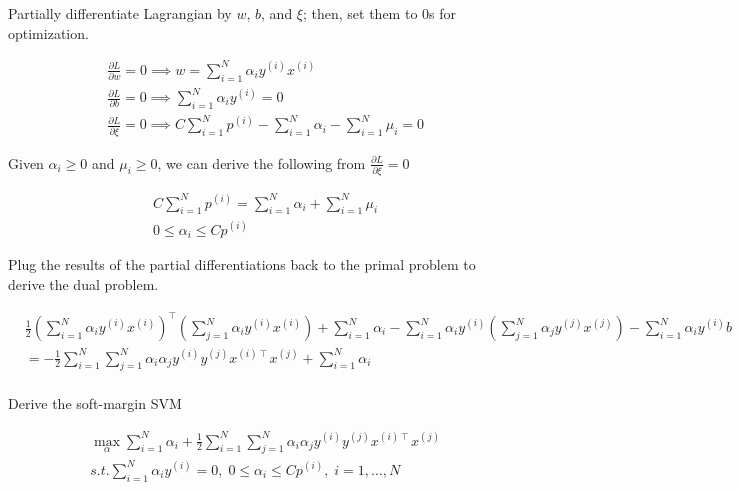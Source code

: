 \documentclass{article}
\theoremstyle{definition}
\theoremstyle{remark}
\begin{document}
\begin{enumerate}[font={\Large\bfseries},left=0pt]
\begin{tcolorbox}
\begin{enumerate}
\begin{enumerate}
				            Partially differentiate Lagrangian by $w$, $b$, and $\xi$; then, set them to 0s for optimization.

				            \begin{align}
					             & \frac{\partial L}{\partial w} = 0 \implies w = \sum^{N}_{i = 1} \alpha_i y^{(i)}x^{(i)}                                      \\
					             & \frac{\partial L}{\partial b} = 0 \implies \sum^{N}_{i = 1} \alpha_i y^{(i)} = 0                                             \\
					             & \frac{\partial L }{\partial \xi} = 0 \implies C\sum^N_{i = 1} p^{(i)} - \sum^{N}_{i =1}\alpha_i - \sum^{N}_{i = 1} \mu_i = 0
				            \end{align}

				            Given $\alpha_i \ge 0$ and $\mu_i \ge 0$, we can derive the following from $\frac{\partial L }{\partial \xi} = 0 $

				            \begin{align}
					             & C\sum^N_{i = 1} p^{(i)} = \sum^{N}_{i =1}\alpha_i + \sum^{N}_{i = 1} \mu_i \\
					             & 0 \le \alpha_i \le Cp^{(i)}
				            \end{align}

				            Plug the results of the partial differentiations back to the primal problem to derive the dual problem.

				            \begin{align}
					             & \frac{1}{2} \left(\sum^N_{i = 1} \alpha_i y^{(i)} x^{(i)} \right)^\intercal \left(\sum^N_{j = 1} \alpha_i y^{(i)} x^{(i)} \right) + \sum^N_{i = 1} \alpha_i - \sum^{N}_{i = 1} \alpha_i y^{(i)} \left(\sum^{N}_{j = 1}\alpha_j y^{(j)}x^{(j)}\right) - \sum^N_{i = 1} \alpha_i y^{(i)}b \\
					             & =-\frac{1}{2} \sum^N_{i=1}\sum^N_{j=1} \alpha_i \alpha_j y^{(i)}y^{(j)} x^{(i)\intercal}x^{(j)} + \sum^N_{i = 1} \alpha_i                                                                                                                                                               \\
				            \end{align}

				            Derive the soft-margin SVM

				            \begin{align}
					             & \max_{\alpha} \sum^N_{i = 1} \alpha_i + \frac{1}{2} \sum^N_{i=1}\sum^N_{j=1} \alpha_i \alpha_j y^{(i)}y^{(j)} x^{(i)\intercal}x^{(j)} \\
					             & s.t. \sum^{N}_{i = 1} \alpha_i y^{(i)} = 0,\; 0 \le \alpha_i \le Cp^{(i)}, \; i = 1, \dots, N
				            \end{align}


\end{enumerate}
\end{enumerate}
\end{tcolorbox}
\end{enumerate}
\end{document}
